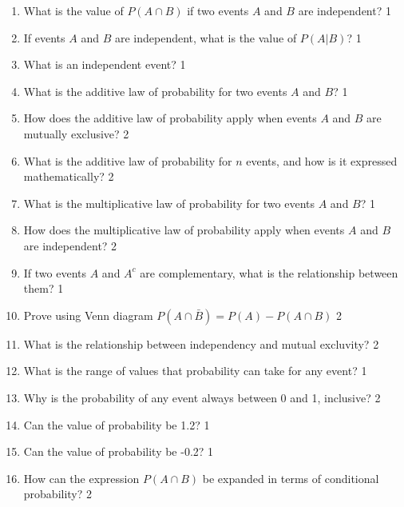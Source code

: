 \documentclass[a4paper,oneside, margin=1.4in]{book}
\begin{document}
\begin{enumerate}
\item What is the value of $P(A \cap B)$ if two events \( A \) and \( B \) are independent? \hfill 1

\item If events \( A \) and \( B \) are independent, what is the value of \( P(A|B) \)? \hfill 1

\item What is an independent event? \hfill 1

\item What is the additive law of probability for two events \( A \) and \( B \)? \hfill 1

\item How does the additive law of probability apply when events \( A \) and \( B \) are mutually exclusive? \hfill 2

\item What is the additive law of probability for \( n \) events, and how is it expressed mathematically? \hfill 2

\item What is the multiplicative law of probability for two events \( A \) and \( B \)? \hfill 1

\item How does the multiplicative law of probability apply when events \( A \) and \( B \) are independent? \hfill 2

\item If two events \( A \) and \( A^c \) are complementary, what is the relationship between them? \hfill 1

\item Prove using Venn diagram $P(A\cap \bar B) = P(A) - P(A\cap B)$ \hfill 2

 \item 	What is the relationship between independency and mutual excluvity? \hfill 2

\item What is the range of values that probability can take for any event? \hfill 1

\item Why is the probability of any event always between 0 and 1, inclusive? \hfill 2

\item Can the value of probability be 1.2? \hfill 1

\item Can the value of probability be -0.2? \hfill 1

\item How can the expression \( P(A \cap B) \) be expanded in terms of conditional probability? \hfill 2


\end{enumerate}
\end{document}
